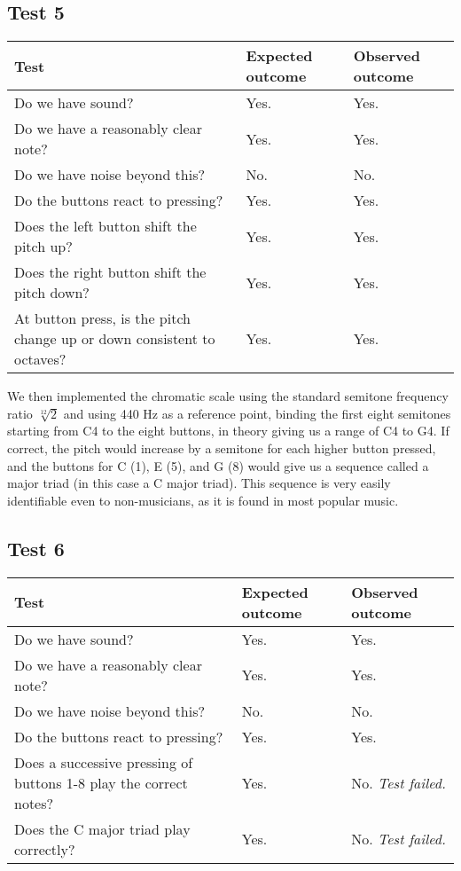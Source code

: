 \subsection*{Test 5}
\begin{center}
\begin{tabular}{|p{3.6cm}|p{3.6cm}|p{3.6cm}|}
\hline
{\sc Test} & {\sc Expected outcome} & {\sc Observed outcome}\\ \hline
Do we have sound? & Yes. & Yes. \\ \hline
Do we have a reasonably clear note? & Yes. & Yes. \\ \hline
Do we have noise beyond this? & No. & No. \\ \hline
Do the buttons react to pressing? & Yes. & Yes. \\ \hline
Does the left button shift the pitch up? & Yes. & Yes. \\ \hline
Does the right button shift the pitch down? & Yes. & Yes. \\ \hline
At button press, is the pitch change up or down consistent to octaves? &
Yes. & Yes. \\ \hline
\end{tabular}
\end{center}

We then implemented the chromatic scale using the standard semitone
frequency ratio $\sqrt[12]{2}$ and using 440 Hz as a reference
point, binding the first eight semitones starting from C4 to the eight
buttons, in theory giving us a range of C4 to G4. If correct, the pitch
would increase by a semitone for each higher button pressed, and the
buttons for C (1), E (5), and G (8) would give us a sequence called a
major triad (in this case a C major triad). This sequence is very easily identifiable even to
non-musicians, as it is found in most popular music.

\subsection*{Test 6}
\begin{center}
\begin{tabular}{|p{3.6cm}|p{3.6cm}|p{3.6cm}|}
\hline
{\sc Test} & {\sc Expected outcome} & {\sc Observed outcome}\\ \hline
Do we have sound? & Yes. & Yes.\\ \hline
Do we have a reasonably clear note? & Yes. & Yes. \\ \hline
Do we have noise beyond this? & No. & No. \\ \hline
Do the buttons react to pressing? & Yes. & Yes.\\ \hline
Does a successive pressing of buttons 1-8 play the correct notes? & Yes. & No. {\em Test failed.}\\ \hline
Does the C major triad play correctly? & Yes. & No. {\em Test failed.}\\ \hline
\end{tabular}
\end{center}

